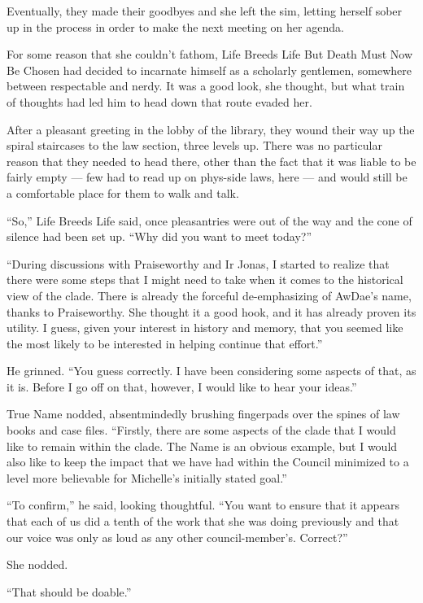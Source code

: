 Eventually, they made their goodbyes and she left the sim, letting herself sober up in the process in order to make the next meeting on her agenda.

For some reason that she couldn't fathom, Life Breeds Life But Death Must Now Be Chosen had decided to incarnate himself as a scholarly gentlemen, somewhere between respectable and nerdy. It was a good look, she thought, but what train of thoughts had led him to head down that route evaded her.

After a pleasant greeting in the lobby of the library, they wound their way up the spiral staircases to the law section, three levels up. There was no particular reason that they needed to head there, other than the fact that it was liable to be fairly empty — few had to read up on phys-side laws, here — and would still be a comfortable place for them to walk and talk.

``So,'' Life Breeds Life said, once pleasantries were out of the way and the cone of silence had been set up. ``Why did you want to meet today?''

``During discussions with Praiseworthy and Ir Jonas, I started to realize that there were some steps that I might need to take when it comes to the historical view of the clade. There is already the forceful de-emphasizing of AwDae's name, thanks to Praiseworthy. She thought it a good hook, and it has already proven its utility. I guess, given your interest in history and memory, that you seemed like the most likely to be interested in helping continue that effort.''

He grinned. ``You guess correctly. I have been considering some aspects of that, as it is. Before I go off on that, however, I would like to hear your ideas.''

True Name nodded, absentmindedly brushing fingerpads over the spines of law books and case files. ``Firstly, there are some aspects of the clade that I would like to remain within the clade. The Name is an obvious example, but I would also like to keep the impact that we have had within the Council minimized to a level more believable for Michelle's initially stated goal.''

``To confirm,'' he said, looking thoughtful. ``You want to ensure that it appears that each of us did a tenth of the work that she was doing previously and that our voice was only as loud as any other council-member's. Correct?''

She nodded.

``That should be doable.''


